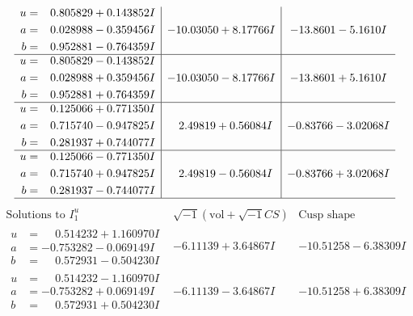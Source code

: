 \documentclass[1p]{elsarticle_modified}
\theoremstyle{definition}
\newcommand{\I}{\sqrt{-1}}
\begin{document}
$$\begin{array}{c|c|c}
\begin{aligned}
u &= \phantom{-}0.805829 + 0.143852 I \\
a &= \phantom{-}0.028988 - 0.359456 I \\
b &= \phantom{-}0.952881 - 0.764359 I\end{aligned}
 & -10.03050 + 8.17766 I & -13.8601 - 5.1610 I \\ \hline\begin{aligned}
u &= \phantom{-}0.805829 - 0.143852 I \\
a &= \phantom{-}0.028988 + 0.359456 I \\
b &= \phantom{-}0.952881 + 0.764359 I\end{aligned}
 & -10.03050 - 8.17766 I & -13.8601 + 5.1610 I \\ \hline\begin{aligned}
u &= \phantom{-}0.125066 + 0.771350 I \\
a &= \phantom{-}0.715740 - 0.947825 I \\
b &= \phantom{-}0.281937 + 0.744077 I\end{aligned}
 & \phantom{-}2.49819 + 0.56084 I & -0.83766 - 3.02068 I \\ \hline\begin{aligned}
u &= \phantom{-}0.125066 - 0.771350 I \\
a &= \phantom{-}0.715740 + 0.947825 I \\
b &= \phantom{-}0.281937 - 0.744077 I\end{aligned}
 & \phantom{-}2.49819 - 0.56084 I & -0.83766 + 3.02068 I\\
 \hline 
 \end{array}$$\newpage$$\begin{array}{c|c|c}  
\text{Solutions to }I^u_{1}& \I (\text{vol} + \sqrt{-1}CS) & \text{Cusp shape}\\
 \hline 
\begin{aligned}
u &= \phantom{-}0.514232 + 1.160970 I \\
a &= -0.753282 - 0.069149 I \\
b &= \phantom{-}0.572931 - 0.504230 I\end{aligned}
 & -6.11139 + 3.64867 I & -10.51258 - 6.38309 I \\ \hline\begin{aligned}
u &= \phantom{-}0.514232 - 1.160970 I \\
a &= -0.753282 + 0.069149 I \\
b &= \phantom{-}0.572931 + 0.504230 I\end{aligned}
 & -6.11139 - 3.64867 I & -10.51258 + 6.38309 I \\ \hline\begin{aligned}

\end{aligned}
\end{array}$$
\end{document}
